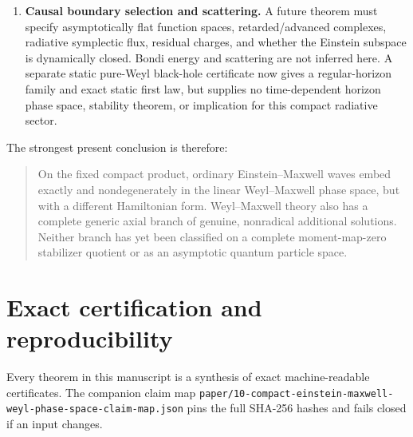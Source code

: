 \documentclass[11pt]{article}
\theoremstyle{remark}
\newcommand{\cert}[1]{\nolinkurl{#1}}
\begin{document}
\begin{enumerate}
to a separate nonlinear charge-fibre paper and successor certificates.
Selected algebraically special Kundt waves on
direct-product electrovacua are known to survive broad higher-order
modifications \cite{KrtousEtAl,Ortaggio}; the open question here is whether
the complete harmonic Einstein tangent, rather than those special exact
families, is nonlinearly closed in this fixed compact theory.
\item \textbf{Causal boundary selection and scattering.} A future theorem
must specify asymptotically flat function spaces, retarded/advanced
complexes, radiative symplectic flux, residual charges, and whether the
Einstein subspace is dynamically closed. Bondi energy and scattering are not
inferred here.  A separate static pure-Weyl black-hole certificate now gives
a regular-horizon family and exact static first law, but supplies no
time-dependent horizon phase space, stability theorem, or implication for
this compact radiative sector.
\end{enumerate}

The strongest present conclusion is therefore:
\begin{quote}
On the fixed compact product, ordinary Einstein--Maxwell waves embed exactly
and nondegenerately in the linear Weyl--Maxwell phase space, but with a
different Hamiltonian form. Weyl--Maxwell theory also has a complete generic
axial branch of genuine, nonradical additional solutions. Neither branch has
yet been classified on a complete moment-map-zero stabilizer quotient or as
an asymptotic
quantum particle space.
\end{quote}

\section{Exact certification and reproducibility}\label{sec:repro}

Every theorem in this manuscript is a synthesis of exact machine-readable
certificates. The companion claim map
\cert{paper/10-compact-einstein-maxwell-weyl-phase-space-claim-map.json}
pins the full SHA-256 hashes and fails closed if an input changes.
\end{document}
